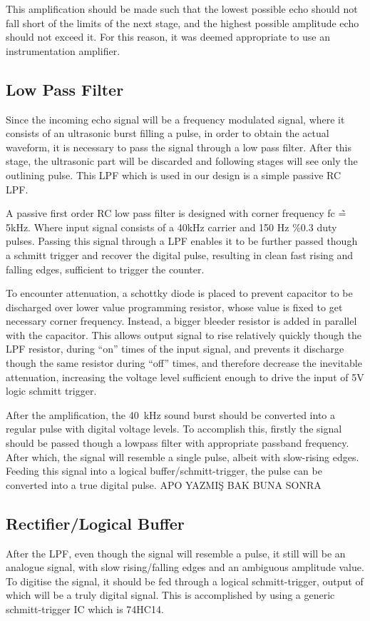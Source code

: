 \documentclass[12pt, a4paper]{article}
\begin{document}
	This amplification should be made such that the lowest possible echo should not fall short of the limits of the next stage, and the highest possible amplitude echo should not exceed it.  For this reason, it was deemed appropriate to use an instrumentation amplifier. 
	
	\subsection{Low Pass Filter}
	Since the incoming echo signal will be a frequency modulated signal, where it consists of an ultrasonic burst filling a pulse, in order to obtain the actual waveform, it is necessary to pass the signal through a low pass filter. 
	After this stage, the ultrasonic part will be discarded and following stages will see only the outlining pulse. This LPF which is used in our design is a simple passive RC LPF.
	
	\bigskip
	A passive first order RC low pass filter is designed with corner frequency fc \~= 5kHz. Where input signal consists of a 40kHz carrier and 150 Hz \%0.3 duty pulses. Passing this signal through a LPF enables it to be further passed though a schmitt trigger and recover the digital pulse, resulting in clean fast rising and falling edges, sufficient to trigger the counter.
	
	\bigskip
	To encounter attenuation, a schottky diode is placed to prevent capacitor to be discharged over lower value programming resistor, whose value is fixed to get necessary corner frequency. Instead, a bigger bleeder resistor is added in parallel with the capacitor. This allows output signal to rise relatively quickly though the LPF resistor, during “on” times of the input signal, and prevents it discharge though the same resistor during “off” times, and therefore decrease the inevitable attenuation, increasing the voltage level sufficient enough to drive the input of 5V logic schmitt trigger.
	
	 \bigskip
    After the amplification, the \SI{40}{\kilo\hertz} sound burst should be converted into a regular pulse with digital voltage levels. To accomplish this, firstly the signal should be passed though a lowpass filter with appropriate passband frequency. After which, the signal will resemble a single pulse, albeit with slow-rising edges. Feeding this signal into a logical buffer/schmitt-trigger, the pulse can be converted into a true digital pulse.  APO YAZMIŞ BAK BUNA SONRA

	\subsection{Rectifier/Logical Buffer}
	After the LPF, even though the signal will resemble a pulse, it still will be an analogue signal, with slow rising/falling edges and an ambiguous amplitude value. To digitise the signal, it should be fed through a logical schmitt-trigger, output of which will be a truly digital signal. This is accomplished by using a generic schmitt-trigger IC which is 74HC14.
\end{document}
